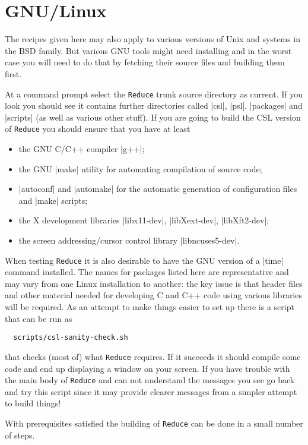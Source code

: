 \documentclass[12pt,twoside,openright]{memoir}
\newcommand{\reduce}{\texttt{Reduce}\xspace}
\begin{document}
\section{GNU/Linux}
\label{sec:gnulinux}
The recipes given here may also apply to various versions of Unix and systems
in the BSD family. But various GNU tools might need installing and in the worst
case you will need to do that by fetching their source files and building
them first.

At a command prompt select the \reduce trunk source directory as current. If
you look you should see it contains further directories called |csl|, |psl|,
|packages| and |scripts| (as well as various other stuff). If you are going to
build the CSL version of \reduce you should ensure that you have at least
\begin{itemize}
\item the GNU C/C++ compiler |g++|;
\item the GNU |make| utility for automating compilation of source code;
\item |autoconf| and |automake| for the automatic generation of configuration
  files and |make| scripts;
\item the X development libraries |libx11-dev|, |libXext-dev|, |libXft2-dev|;
\item the screen addressing/cursor control library |libncuses5-dev|.
\end{itemize}
When testing \reduce it is also desirable to have the GNU version of a |time|
command installed.  The names for packages listed here are representative and
may vary from one Linux installation to another: the key issue is that header
files and other material needed for developing C and C++ code using various
libraries will be required. As an attempt to make things easier to set up there
is a script that can be run as
\begin{verbatim}
  scripts/csl-sanity-check.sh
\end{verbatim}
\noindent that checks (most of) what \reduce requires. If it succeeds it should
compile some code and end up displaying a window on your screen. If you have
trouble with the main body of \reduce and can not understand the messages you
see go back and try this script since it may provide clearer messages from
a simpler attempt to build things!

With prerequisites satisfied the building of \reduce can be done in a small
number of steps.
\end{document}
